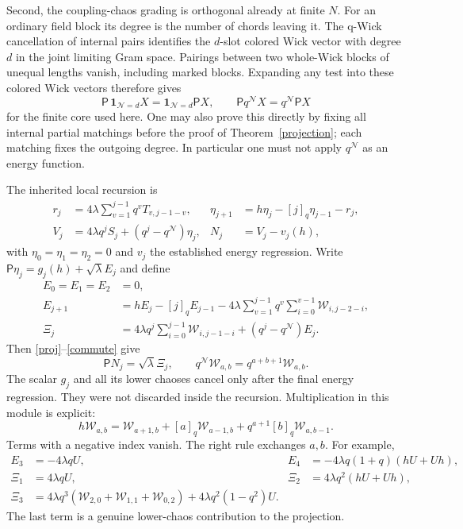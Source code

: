 \documentclass[11pt]{article}
\newcommand{\PP}{\mathsf P}
\newcommand{\NN}{\mathcal N}
\newcommand{\WW}{\mathcal W}
\begin{document}
Second, the coupling-chaos grading is orthogonal already at
finite $N$. For an ordinary field block its degree is the number
of chords leaving it. The q-Wick cancellation of internal pairs
identifies the $d$-slot colored Wick vector with degree $d$ in the
joint limiting Gram space. Pairings between two whole-Wick blocks
of unequal lengths vanish, including marked blocks. Expanding any
test into these colored Wick vectors therefore gives
\begin{equation}\label{commute}
 \PP\,\mathbf1_{\NN=d}X=\mathbf1_{\NN=d}\PP X,
 \qquad\PP q^{\NN}X=q^{\NN}\PP X
\end{equation}
for the finite core used here. One may also prove this directly by
fixing all internal partial matchings before the proof of
Theorem~\ref{projection}; each matching fixes the outgoing degree.
In particular one must not apply $q^{\NN}$ as an energy function.

The inherited local recursion \cite{desc} is
\begin{align}
 r_j&=4\lambda\sum_{v=1}^{j-1}q^vT_{v,j-1-v},&
 \eta_{j+1}&=h\eta_j-[j]_q\eta_{j-1}-r_j,\\
 V_j&=4\lambda q^jS_j+(q^j-q^{\NN})\eta_j,&
 N_j&=V_j-v_j(h),
\end{align}
with $\eta_0=\eta_1=\eta_2=0$ and $v_j$ the established energy
regression. Write $\PP\eta_j=g_j(h)+\sqrt\lambda E_j$ and define
\begin{align}\label{rec}
 E_0=E_1=E_2&=0,\\
 E_{j+1}&=hE_j-[j]_qE_{j-1}
 -4\lambda\sum_{v=1}^{j-1}q^v
                  \sum_{i=0}^{v-1}\WW_{i,j-2-i},\\
 \Xi_j&=4\lambda q^j\sum_{i=0}^{j-1}\WW_{i,j-1-i}
                   +(q^j-q^{\NN})E_j.
\end{align}
Then \eqref{proj}--\eqref{commute} give
\begin{equation}\label{Nj}
 \PP N_j=\sqrt\lambda\Xi_j,\qquad
 q^{\NN}\WW_{a,b}=q^{a+b+1}\WW_{a,b}.
\end{equation}
The scalar $g_j$ and all its lower chaoses cancel only after the
final energy regression. They were not discarded inside the recursion.
Multiplication in this module is explicit:
\begin{equation}\label{left}
 h\WW_{a,b}=\WW_{a+1,b}+[a]_q\WW_{a-1,b}
                       +q^{a+1}[b]_q\WW_{a,b-1}.
\end{equation}
Terms with a negative index vanish. The right rule exchanges $a,b$.
For example,
\begin{align*}
 E_3&=-4\lambda qU,&E_4&=-4\lambda q(1+q)(hU+Uh),\\
 \Xi_1&=4\lambda qU,&\Xi_2&=4\lambda q^2(hU+Uh),\\
 \Xi_3&=4\lambda q^3(\WW_{2,0}+\WW_{1,1}+\WW_{0,2})
                     +4\lambda q^2(1-q^2)U.
\end{align*}
The last term is a genuine lower-chaos contribution to the projection.
\end{document}
